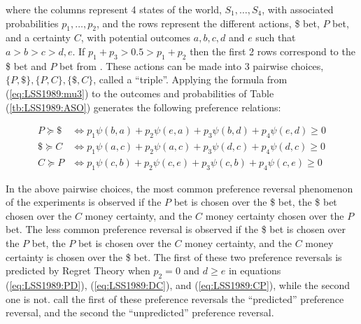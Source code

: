 \documentclass[../main.tex]{subfiles}
\begin{document}
\noindent where the columns represent 4 states of the world, $S_1 , \ldots , S_4$, with associated probabilities $p_1, \ldots, p_2$, and the rows represent the different actions, \$ bet, $P$ bet, and a certainty $C$, with potential outcomes $a,b,c,d$ and $e$ such that $a > b > c > d,e$.
If $p_1 + p_3 > 0.5 > p_1 + p_2$ then the first 2 rows correspond to the \$ bet and $P$ bet from \textcite{Grether1979}.
These actions can be made into 3 pairwise choices, $\lbrace P , \$ \rbrace , \lbrace P,C \rbrace , \lbrace \$, C \rbrace$, called a \enquote{triple}.
Applying the formula from (\ref{eq:LSS1989:mu3}) to the outcomes and probabilities of Table (\ref{tb:LSS1989:ASO}) generates the following preference relations:

\begin{align}
	P  \succcurlyeq \$ &\Leftrightarrow p_1 \psi(b,a) + p_2 \psi(e,a) + p_3 \psi(b,d) + p_4 \psi(e,d) \geq 0 \label{eq:LSS1989:PD}\\
	\$ \succcurlyeq C  &\Leftrightarrow p_1 \psi(a,c) + p_2 \psi(a,c) + p_3 \psi(d,c) + p_4 \psi(d,c) \geq 0 \label{eq:LSS1989:DC}\\
	C  \succcurlyeq P  &\Leftrightarrow p_1 \psi(c,b) + p_2 \psi(c,e) + p_3 \psi(c,b) + p_4 \psi(c,e) \geq 0 \label{eq:LSS1989:CP}
\end{align}

In the above pairwise choices, the most common preference reversal phenomenon of the \textcite{Grether1979} experiments is observed if the $P$ bet is chosen over the \$ bet, the \$ bet chosen over the $C$ money certainty, and the $C$ money certainty chosen over the $P$ bet.
The less common preference reversal is observed if the \$ bet is chosen over the $P$ bet, the $P$ bet is chosen over the $C$ money certainty, and the $C$ money certainty is chosen over the \$ bet.
The first of these two preference reversals is predicted by Regret Theory when $p_2 =0$ and $d \geq e$ in equations (\ref{eq:LSS1989:PD}), (\ref{eq:LSS1989:DC}), and (\ref{eq:LSS1989:CP}), while the second one is not.
\textcite[143]{Loomes1989} call the first of these preference reversals the \enquote{predicted} preference reversal, and the second the \enquote{unpredicted} preference reversal.
\end{document}
